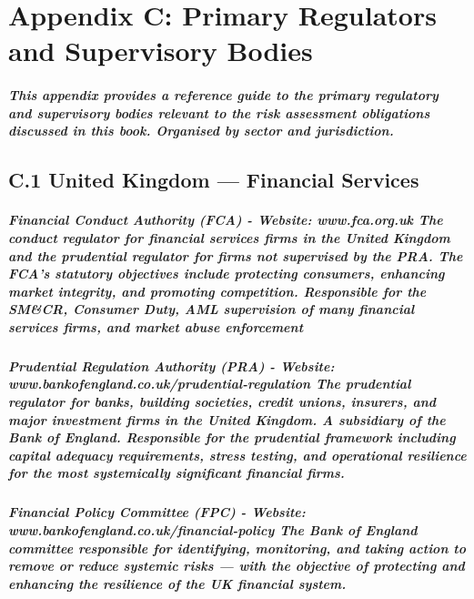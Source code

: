 \chapter*{Appendix C: Primary Regulators and Supervisory Bodies}
\label{chap:Appendix C: Primary Regulators and Supervisory Bodies}

\paragraph{This appendix provides a reference guide to the primary regulatory and supervisory bodies relevant to the risk assessment obligations discussed in this book. Organised by sector and jurisdiction.}

\section*{C.1 United Kingdom — Financial Services}
\paragraph{\textbf{Financial Conduct Authority (FCA)} - Website: \textit{www.fca.org.uk} The conduct regulator for financial services firms in the United Kingdom and the prudential regulator for firms not supervised by the PRA. The FCA's statutory objectives include protecting consumers, enhancing market integrity, and promoting competition. Responsible for the SM\&CR, Consumer Duty, AML supervision of many financial services firms, and market abuse enforcement}
\paragraph{\textbf{Prudential Regulation Authority (PRA)} - Website: \textit{www.bankofengland.co.uk/prudential-regulation} The prudential regulator for banks, building societies, credit unions, insurers, and major investment firms in the United Kingdom. A subsidiary of the Bank of England. Responsible for the prudential framework including capital adequacy requirements, stress testing, and operational resilience for the most systemically significant financial firms.}
\paragraph{\textbf{Financial Policy Committee (FPC)} - Website: \textit{www.bankofengland.co.uk/financial-policy} The Bank of England committee responsible for identifying, monitoring, and taking action to remove or reduce systemic risks — with the objective of protecting and enhancing the resilience of the UK financial system.}
